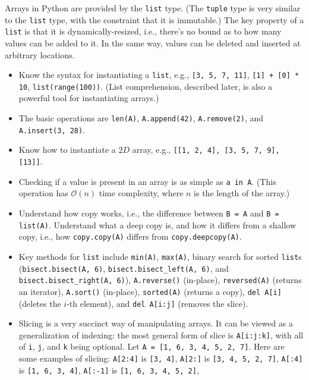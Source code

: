 \documentclass[10pt,openany,twoside,letterpaper,extrafontsizes]{memoir}
\newif\ifPython
\begin{document}
\begin{Spacing}{\arraysSpacing}
\ifPython
Arrays in Python are provided by the \texttt{list} type.
(The \texttt{tuple} type is very similar to the \texttt{list} type, with the constraint that it is immutable.)
The key property of a \texttt{list} is that it is dynamically-resized, i.e., there's no bound as to how many values can be added to it.
In the same way, values can be deleted and inserted at arbitrary locations.
\begin{itemize}
\item Know the syntax for instantiating a \texttt{list}, e.g., \texttt{[3, 5, 7, 11]}, \texttt{[1] + [0] * 10}, \texttt{list(range(100))}.
(List comprehension, described later, is also a powerful tool for instantiating arrays.)
\item The basic operations are \texttt{len(A)}, \texttt{A.append(42)}, \texttt{A.remove(2)}, and \texttt{A.insert(3, 28)}.
\item Know how to instantiate a $2D$ array, e.g., \texttt{[[1, 2, 4], [3, 5, 7, 9], [13]]}.
\item Checking if a value is present in an array is as simple as \texttt{a in A}.
(This operation has $\mathcal{O}(n)$ time complexity, where $n$ is the length
of the array.)
\item Understand how copy works, i.e., the difference between \texttt{B = A} and \texttt{B = list(A)}.
Understand what a deep copy is, and how it differs from a shallow copy, i.e., how \texttt{copy.copy(A)} differs from \texttt{copy.deepcopy(A)}.
\item Key methods for \texttt{list} include \texttt{min(A)}, \texttt{max(A)}, binary search for sorted \texttt{list}s (\texttt{bisect.bisect(A, 6)}, \texttt{bisect.bisect\_left(A, 6)}, and \texttt{bisect.bisect\_right(A, 6)}), \texttt{A.reverse()} (in-place), \texttt{reversed(A)} (returns an iterator),
\texttt{A.sort()} (in-place), \texttt{sorted(A)} (returns a copy), \texttt{del A[i]} (deletes the $i$-th element), and \texttt{del A[i:j]} (removes the slice).
\item Slicing is a very succinct way of manipulating arrays. It can be viewed as a generalization of indexing: the most general form of slice is \texttt{A[i:j:k]}, with all of \texttt{i}, \texttt{j}, and \texttt{k} being optional.
\label{py-slice}
Let \texttt{A = [1, 6, 3, 4, 5, 2, 7]}. Here are some examples of slicing:
\texttt{A[2:4]} is \texttt{[3, 4]},
\texttt{A[2:]} is \texttt{[3, 4, 5, 2, 7]},
\texttt{A[:4]} is \texttt{[1, 6, 3, 4]},
\texttt{A[:-1]} is \texttt{[1, 6, 3, 4, 5, 2]},

\end{itemize}
\end{Spacing}
\end{document}
